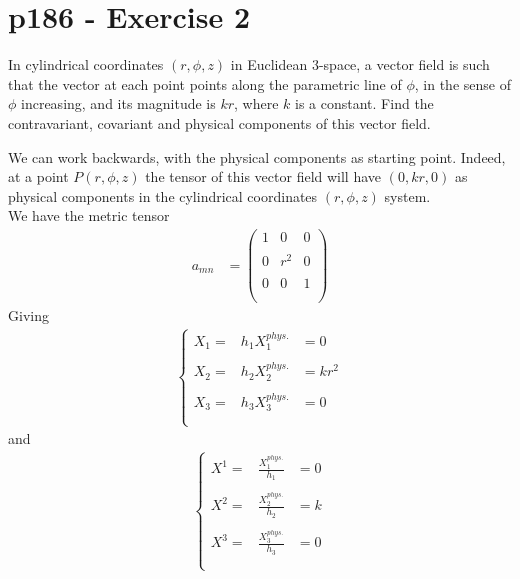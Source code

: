 \section{p186 - Exercise 2}
\begin{tcolorbox}
In cylindrical coordinates $\left(r, \phi,z\right)$ in Euclidean $3$-space, a vector field is such that the vector at each point points along the parametric line of $\phi$, in the sense of $\phi$ increasing, and its magnitude is $kr$, where $k$ is a constant. Find the contravariant, covariant and physical components of this vector field.
\end{tcolorbox}
We can work backwards, with the physical components as starting point. Indeed, at a point $P\left(r,\phi,z\right)$ the tensor of this vector field will have $\left(0,kr,0\right)$ as physical components in the cylindrical coordinates $\left( r, \phi,z \right)$ system.\\
We have the metric tensor 
\begin{align}
a_{mn} &= \begin{pmatrix}
1&0&0\\\\
0&r^2&0\\\\
0&0&1\\\\
\end{pmatrix}
\end{align}
Giving
\begin{align}
\left\{\begin{array}{lll}
X_1 = &h_1 X_{1}^{phys.}&=0\\\\
X_2 = &h_2 X_{2}^{phys.}&=kr^2\\\\
X_3 = &h_3 X_{3}^{phys.}&=0\\\\
\end{array}\right.
\end{align}
and 
\begin{align}
\left\{\begin{array}{lll}
X^1 = &\frac {X_{1}^{phys.}}{h_1}&=0\\\\
X^2 = &\frac {X_{2}^{phys.}}{h_2}&=k\\\\
X^3 = &\frac {X_{3}^{phys.}}{h_3}&=0\\\\
\end{array}\right.
\end{align}


